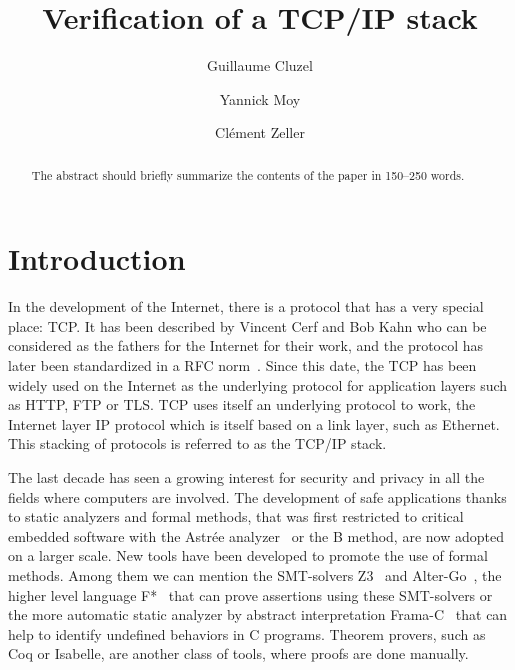 \documentclass[runningheads]{llncs}
\title{Verification of a TCP/IP stack}
\author{Guillaume Cluzel\inst{1,2} \and
        Yannick Moy\inst{1} \and
        Clément Zeller\inst{3}}
\institute{Adacore \and
        École Normale Supérieure de Lyon \and
        Oryx Embedded}
\begin{document}

\maketitle

\begin{abstract}
    The abstract should briefly summarize the contents of the paper in
    150--250 words.

\end{abstract}

\section{Introduction}

    In the development of the Internet, there is a protocol that has a very special place: TCP.
    It has been described by Vincent Cerf and Bob Kahn who can be considered as the fathers for the Internet
    for their work, and the protocol has later been standardized in a RFC norm~\cite{rfc793}.
    Since this date, the TCP has been widely used on the Internet as the underlying protocol for application layers such as HTTP,
    FTP or TLS. TCP uses itself an underlying protocol to work, the Internet layer IP protocol which is itself
    based on a link layer, such as Ethernet. This stacking of protocols is referred to as the TCP/IP stack.

    The last decade has seen a growing interest for security and privacy in all the fields where computers are
    involved. The development of safe applications thanks to static analyzers and formal methods, that was first
    restricted to critical embedded software with the Astrée analyzer~\cite{cousot2005astree} or the B method, are
    now adopted on a larger scale. New tools have been developed to promote the use of formal methods. Among them we
    can mention the SMT-solvers Z3~\cite{de2008z3} and Alter-Go~\cite{conchon:hal-01960203},
    the higher level language F*~\cite{mumon} that can prove assertions
    using these SMT-solvers or the more automatic static analyzer by abstract interpretation Frama-C~\cite{cuoq2012frama}
    that can help to identify undefined behaviors in C programs. Theorem provers, such as Coq or Isabelle, are another class
    of tools, where proofs are done manually.
\end{document}
